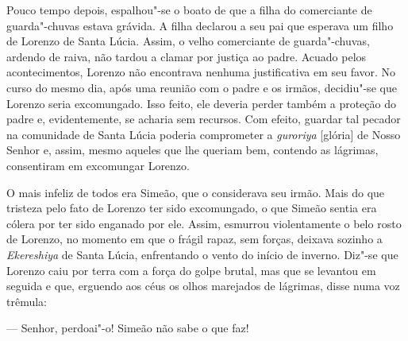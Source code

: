 Pouco tempo depois, espalhou"-se o boato de que a filha do comerciante de
guarda"-chuvas estava grávida. A filha declarou a seu pai que esperava
um filho de Lorenzo de Santa Lúcia. Assim, o velho comerciante de
guarda"-chuvas, ardendo de raiva, não tardou a clamar por justiça ao
padre. Acuado pelos acontecimentos, Lorenzo não encontrava nenhuma
justificativa em seu favor. No curso do mesmo dia, após uma reunião com
o padre e os irmãos, decidiu"-se que Lorenzo seria excomungado. Isso
feito, ele deveria perder também a proteção do padre e, evidentemente,
se acharia sem recursos. Com efeito, guardar tal pecador na comunidade
de Santa Lúcia poderia comprometer a \textit{guroriya} [glória] de
Nosso Senhor e, assim, mesmo aqueles que lhe queriam bem, contendo as
lágrimas, consentiram em excomungar Lorenzo.

O mais infeliz de todos era Simeão, que o considerava seu irmão. Mais do
que tristeza pelo fato de Lorenzo ter sido excomungado, o que Simeão
sentia era cólera por ter sido enganado por ele. Assim, esmurrou
violentamente o belo rosto de Lorenzo, no momento em que o frágil
rapaz, sem forças, deixava sozinho a \textit{Ekereshiya} de Santa
Lúcia, enfrentando o vento do início de inverno. Diz"-se que Lorenzo
caiu por terra com a força do golpe brutal, mas que se levantou em
seguida e que, erguendo aos céus os olhos marejados de lágrimas, disse
numa voz trêmula:

--- Senhor, perdoai"-o! Simeão não sabe o que faz!

